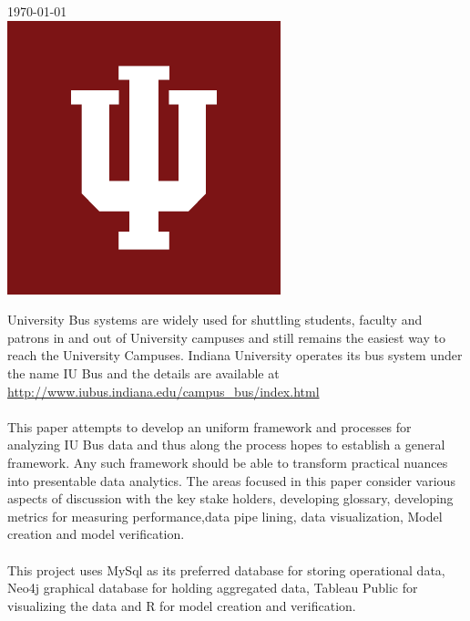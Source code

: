 \documentclass[12pt]{article}
\renewenvironment{abstract}
 {\small
  \begin{center}
  \bfseries \abstractname\vspace{-.5em}\vspace{0pt}
  \end{center}
  \list{}{
    \setlength{\leftmargin}{.5cm}%
    \setlength{\rightmargin}{\leftmargin}%
  }%
  \item\relax}
 {\endlist}
\begin{document}
\begin{titlepage}
{\large \today}\\[2cm] 

\includegraphics[scale=0.3]{iu_logo}\\[1cm] 

\vfill 

\end{titlepage}


\begin{abstract}
University Bus systems are widely used for shuttling students, faculty and patrons in and out of University campuses and still remains the easiest way to reach the University Campuses. Indiana University operates its bus system under the name IU Bus and the details are available at \url{http://www.iubus.indiana.edu/campus_bus/index.html} \\ \\
This paper attempts to develop an uniform framework and processes for analyzing IU Bus data and thus along the process hopes to establish a general framework. Any such framework should be able to transform practical nuances into presentable data analytics. The areas focused in this paper consider various aspects of discussion with the key stake holders, developing glossary, developing metrics for measuring performance,data pipe lining, data visualization, Model creation and model verification.\\ \\
This project uses MySql as its preferred database for storing operational data, Neo4j graphical database for holding aggregated data, Tableau Public for visualizing the data and R for model creation and verification.
\end{abstract}
\end{document}
